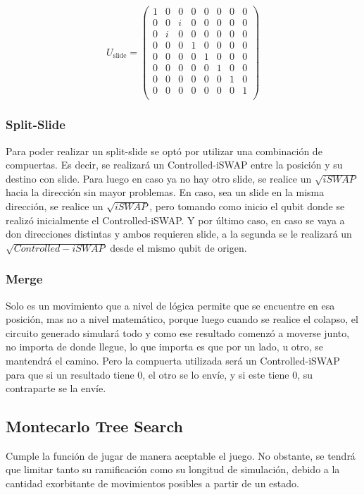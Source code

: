 \[
U_{\text{slide}} = \begin{pmatrix}
	1 & 0 & 0 & 0 & 0 & 0 & 0 & 0 \\
	0 & 0 & i & 0 & 0 & 0 & 0 & 0 \\
	0 & i & 0 & 0 & 0 & 0 & 0 & 0 \\
	0 & 0 & 0 & 1 & 0 & 0 & 0 & 0 \\
	0 & 0 & 0 & 0 & 1 & 0 & 0 & 0 \\
	0 & 0 & 0 & 0 & 0 & 1 & 0 & 0 \\
	0 & 0 & 0 & 0 & 0 & 0 & 1 & 0 \\
	0 & 0 & 0 & 0 & 0 & 0 & 0 & 1 \\
\end{pmatrix}
\]
\subsubsection{Split-Slide}
Para poder realizar un split-slide se optó por utilizar una combinación de compuertas. Es decir, se realizará un Controlled-iSWAP entre la posición y su destino con slide. Para luego en caso ya no hay otro slide, se realice un $\sqrt{iSWAP}$ hacia la dirección sin mayor problemas. En caso, sea un slide en la misma dirección, se realice un $\sqrt{iSWAP}$, pero tomando como inicio el qubit donde se realizó inicialmente el Controlled-iSWAP. Y por último caso, en caso se vaya a don direcciones distintas y ambos requieren slide, a la segunda se le realizará un $\sqrt{Controlled-iSWAP}$  desde el mismo qubit de origen.
\subsubsection{Merge}
Solo es un movimiento que a nivel de lógica permite que se encuentre en esa posición, mas no a nivel matemático, porque luego cuando se realice el colapso, el circuito generado simulará todo y como ese resultado comenzó a moverse junto, no importa de donde llegue, lo que importa es que por un lado, u otro, se mantendrá el camino. Pero la compuerta utilizada será un Controlled-iSWAP para que si un resultado tiene 0, el otro se lo envíe, y si este tiene 0, su contraparte se la envíe.
\subsection{Montecarlo Tree Search}
Cumple la función de jugar de manera aceptable el juego. No obstante, se tendrá que limitar tanto su ramificación como su longitud de simulación, debido a la cantidad exorbitante de movimientos posibles a partir de un estado.

